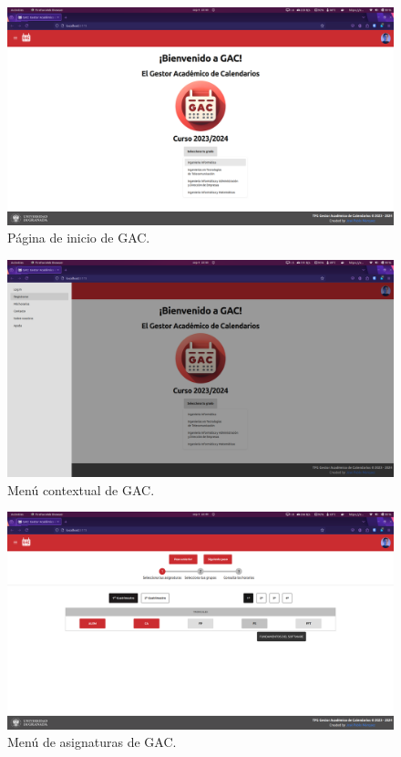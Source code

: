 \begin{figure}[H]
    \centering
    \includegraphics[width=1\textwidth]{imagenes/GAC_inicio.png}
    \caption{Página de inicio de GAC.}
    \label{fig:GAC_inicio}
\end{figure}

\begin{figure}[H]
    \centering
    \includegraphics[width=1\textwidth]{imagenes/GAC_menu.png}
    \caption{Menú contextual de GAC.}
    \label{fig:GAC_menu}
\end{figure}

\begin{figure}[H]
    \centering
    \includegraphics[width=1\textwidth]{imagenes/GAC_asignaturas.png}
    \caption{Menú de asignaturas de GAC.}
    \label{fig:GAC_asignaturas}
\end{figure}

